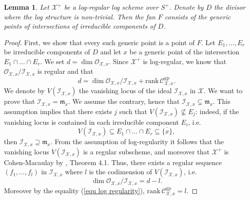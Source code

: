 \documentclass{amsart}%
\numberwithin{equation}{subsection}
\theoremstyle{plain2}
\newtheorem{lemma}[equation]{Lemma}
\theoremstyle{definition2}
\theoremstyle{stepstyle}
\theoremstyle{point}
\theoremstyle{subpoint}
\newcommand{\cX}{\ensuremath{\mathscr{X}}}
\newcommand{\caM}{\ensuremath{\mathcal{M}}}
\newcommand{\caO}{\ensuremath{\mathcal{O}}}
\newcommand{\caI}{\ensuremath{\mathcal{I}}}
\newcommand{\gp}{\mathrm{gp}}
\begin{document}
\begin{lemma} \label{lemma points Kato fan}
Let $\cX^+$ be a log-regular log scheme over $S^+$. Denote by $D$ the divisor where the log structure is non-trivial. Then the fan $F$ consists of the generic points of intersections of irreducible components of $D$.
\end{lemma}
\begin{proof}
First, we show that every such generic point is a point of $F$. Let $E_1,\ldots,E_r$ be irreducible components of $D$ and let $x$ be a generic point of the intersection $E_1\cap\ldots\cap E_r$. We set $d=\dim \mathcal{O}_{\cX,x}$. Since $\cX^+$ is log-regular, we know that $\mathcal{O}_{\cX,x}/\mathcal{I}_{\cX,x}$ is regular and that \begin{equation} \label{equ log regularity}
d=\dim \mathcal{O}_{\cX,x}/\mathcal{I}_{\cX,x}+\mathrm{rank}\,\mathcal{C}^{\gp}_{\cX,x}.\end{equation} We denote by $V(\caI_{\cX,x})$ the vanishing locus of the ideal $\caI_{\cX,x}$ in $\cX$.
We want to prove that $\caI_{\cX,x}= \mathfrak{m}_x$. We assume the contrary, hence that $\caI_{\cX,x} \subsetneq \mathfrak{m}_x$. This assumption implies that there exists $j$ such that $V(\caI_{\cX,x}) \nsubseteq E_j$: indeed, if the vanishing locus is contained in each irreducible component $E_i$, i.e. $$V(\caI_{\cX,x}) \subseteq E_1 \cap \ldots \cap E_r \subseteq \overline{\{x\}},$$ then $\caI_{\cX,x} \supseteq \mathfrak{m}_x$. From the assumption of log-regularity it follows that the vanishing locus $V(\caI_{\cX,x})$ is a regular subscheme, and moreover that $\cX^+$ is Cohen-Macaulay by \cite{Kato1994a}, Theorem 4.1. Thus, there exists a regular sequence $(f_1,\ldots,f_l)$ in $\caI_{\cX,x}$ where $l$ is the codimension of $V(\caI_{\cX,x})$, i.e. $$ \dim \mathcal{O}_{\cX,x}/\mathcal{I}_{\cX,x} = d-l.$$ Moreover by the equality (\ref{equ log regularity}), $\mathrm{rank}\,\mathcal{C}^{\gp}_{\cX,x} = l$.
%
 

\end{proof}
\end{document}
